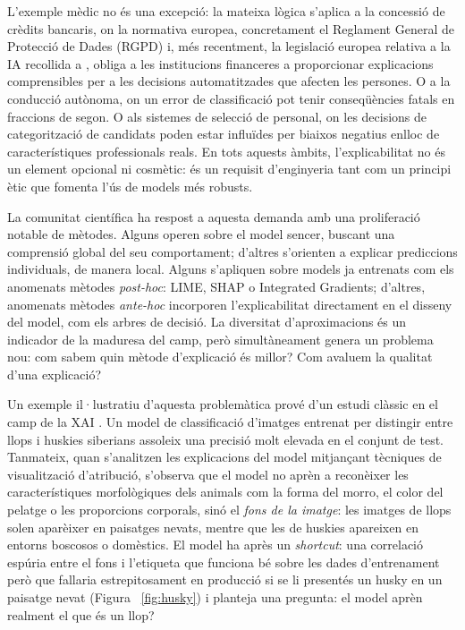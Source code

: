 L'exemple mèdic no és una excepció: la mateixa lògica s'aplica a la concessió de crèdits bancaris, on la normativa europea, concretament el Reglament General de Protecció de Dades (RGPD) i, més recentment, la legislació europea relativa a la IA recollida a \cite{EUAIAct24}, obliga a les institucions financeres a proporcionar explicacions comprensibles per a les decisions automatitzades que afecten les persones. O a la conducció autònoma, on un error de classificació pot tenir conseqüències fatals en fraccions de segon. O als sistemes de selecció de personal, on les decisions de categorització de candidats poden estar influïdes per biaixos negatius enlloc de característiques professionals reals. En tots aquests àmbits, l'explicabilitat no és un element opcional ni cosmètic: és un requisit d'enginyeria tant com un principi ètic que fomenta l'ús de models més robusts.

La comunitat científica ha respost a aquesta demanda amb una proliferació notable de mètodes. Alguns operen sobre el model sencer, buscant una comprensió global del seu comportament; d'altres s'orienten a explicar prediccions individuals, de manera local. Alguns s'apliquen sobre models ja entrenats com els anomenats mètodes \emph{post-hoc}: LIME, SHAP o Integrated Gradients; d'altres, anomenats mètodes \emph{ante-hoc} incorporen l'explicabilitat directament en el disseny del model, com els arbres de decisió. La diversitat d'aproximacions és un indicador de la maduresa del camp, però simultàneament genera un problema nou: com sabem quin mètode d'explicació és millor? Com avaluem la qualitat d'una explicació?

Un exemple il·lustratiu d'aquesta problemàtica prové d'un estudi clàssic en el camp de la \ac{XAI} \cite{Tulio16}. Un model de classificació d'imatges entrenat per distingir entre llops i huskies siberians assoleix una precisió molt elevada en el conjunt de test. Tanmateix, quan s'analitzen les explicacions del model mitjançant tècniques de visualització d'atribució, s'observa que el model no aprèn a reconèixer les característiques morfològiques dels animals com la forma del morro, el color del pelatge o les proporcions corporals, sinó el \emph{fons de la imatge}: les imatges de llops solen aparèixer en paisatges nevats, mentre que les de huskies apareixen en entorns boscosos o domèstics. El model ha après un \emph{shortcut}\cite{Longo2024}: una correlació espúria entre el fons i l'etiqueta que funciona bé sobre les dades d'entrenament però que fallaria estrepitosament en producció si se li presentés un husky en un paisatge nevat (Figura ~\ref{fig:husky}) i planteja una pregunta: el model aprèn realment el que és un llop?

